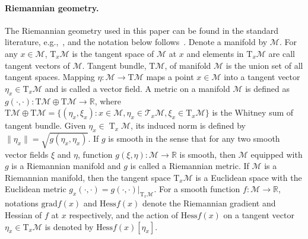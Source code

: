 \documentclass[11pt]{article}
\numberwithin{equation}{section}
\DeclareMathOperator{\T}{\mathrm{T}}
\def\M{\mathcal{M}}
\begin{document}
\paragraph{Riemannian geometry.} The Riemannian geometry used in this paper can be found in the standard literature, e.g.,~\cite{Boothby1975AnIT, AbsMahSep2008}, and the notation below follows~\cite{AbsMahSep2008}. Denote a manifold by $\mathcal{M}$. For any $x\in \mathcal{M}$, $\mathrm{T}_x\mathcal{M}$ is the tangent space of $\mathcal{M}$ at $x$ and elements in $\mathrm{T}_x\mathcal{M}$ are call tangent vectors of $\mathcal{M}$. Tangent bundle, $\mathrm{T}\mathcal{M} $, of manifold $\mathcal{M}$ is the union set of all tangent spaces. Mapping $\eta:\mathcal{M}\rightarrow \mathrm{T}\mathcal{M}$ maps a point $x\in\mathcal{M}$ into a tangent vector $\eta_x\in\mathrm{T}_x\mathcal{M}$ and is called a vector field. 
A metric on a manifold $\mathcal{M}$ is defined as $g(\cdot,\cdot): \mathrm{T}\mathcal{M} \oplus \mathrm{T}\mathcal{M} \rightarrow \mathbb{R}$, where $\mathrm{T}\mathcal{M} \oplus \mathrm{T}\mathcal{M}=\{(\eta_x,\xi_x):x\in \mathcal{M},\eta_x\in\mathcal{T}_x\mathcal{M},\xi_x\in\mathrm{T}_x\mathcal{M}\}$ is the Whitney sum of tangent bundle. Given $\eta_x \in \T_x \mathcal{M}$, its induced norm is defined by $\|\eta_x\| = \sqrt{g(\eta_x, \eta_x)}$.
If $g$ is smooth in the sense that for any two smooth vector fields $\xi$ and $\eta$, function $g(\xi,\eta):\mathcal{M}\rightarrow \mathbb{R}$ is smooth, then $\mathcal{M}$ equipped with $g$ is a Riemannian manifold and $g$ is called a Riemannian metric. 
If $\mathcal{M}$ is a Riemannian manifold, then the tangent space $\mathrm{T}_x\mathcal{M}$ is a Euclidean space with the Euclidean metric $g_x(\cdot,\cdot)=g(\cdot,\cdot)|_{\mathrm{T}_x\mathcal{M}}$. For a smooth function $f:\mathcal{M}\rightarrow \mathbb{R}$, notations $\mathrm{grad}f(x)$ and $\mathrm{Hess}f(x)$ denote the Riemannian gradient and Hessian of $f$ at $x$ respectively, and the action of $\mathrm{Hess}f(x)$ on a tangent vector $\eta_x\in\mathrm{T}_x\mathcal{M}$ is denoted by $\mathrm{Hess}f(x)[\eta_x]$. 
\end{document}
